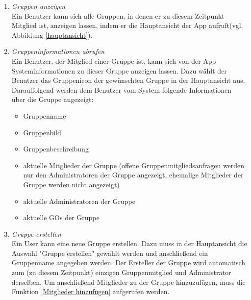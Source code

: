 \documentclass[parskip=full]{scrartcl}
\def\threedigits#1{%
  \ifnum#1<100 0\fi
  \ifnum#1<10 0\fi
  \number#1}
\begin{document}
\begin{enumerate}[label={\textbf{/F\protect\threedigits{\theenumi}0/}}, leftmargin=*, resume]
	\item \textit{Gruppen anzeigen}\label{Gruppen anzeigen} \\ %
	Ein Benutzer kann sich alle Gruppen, in denen er zu diesem Zeitpunkt Mitglied ist, anzeigen lassen, indem er die Hauptansicht der App aufruft(vgl. Abbildung \ref{hauptansicht}).
	
	\item \textit{Gruppeninformationen abrufen}\label{Gruppeninfo anzeigen} \\%
	Ein Benutzer, der Mitglied einer Gruppe ist, kann sich von der App Systeminformationen zu dieser Gruppe anzeigen lassen. Dazu wählt der Benutzer das Gruppenicon der gewünschten Gruppe in der Hauptansicht aus. Darauffolgend werden dem Benutzer vom System folgende Informationen über die Gruppe angezeigt:
	\begin{itemize}
		\item Gruppenname
		\item \colorbox{shadecolor}{Gruppenbild}
		\item \colorbox{shadecolor}{Gruppenbeschreibung}
		\item aktuelle Mitglieder der Gruppe (offene Gruppenmitgliedsanfragen werden nur den Administratoren der Gruppe angezeigt, ehemalige Mitglieder der Gruppe werden nicht angezeigt)
		\item aktuelle Administratoren der Gruppe
		\item aktuelle \glspl{GO} der Gruppe %
	\end{itemize}
	
	\item \textit{Gruppe erstellen}\label{Gruppe erstellen}\\
	Ein User kann eine neue Gruppe erstellen. Dazu muss in der Hauptansicht die Auswahl "Gruppe erstellen" gewählt werden und anschließend ein Gruppenname angegeben werden. Der Ersteller der Gruppe wird automatisch zum (zu diesem Zeitpunkt) einzigen Gruppenmitglied und Administrator derselben. Um anschließend Mitglieder zu der Gruppe hinzuzufügen, muss die Funktion \ref{Mitglieder hinzufügen} aufgerufen werden.
	

\end{enumerate}
\end{document}
